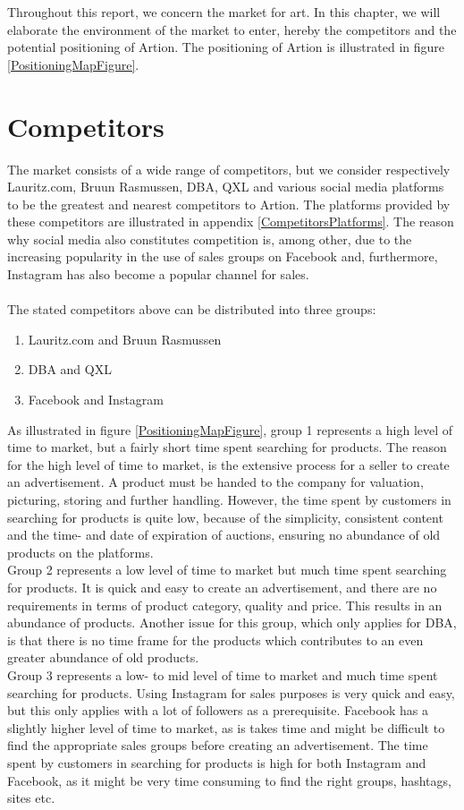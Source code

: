 Throughout this report, we concern the market for art. In this chapter, we will elaborate the environment of the market to enter, hereby the competitors and the potential positioning of Artion. The positioning of Artion is illustrated in figure \ref{PositioningMapFigure}.

\section{Competitors}
The market consists of a wide range of competitors, but we consider respectively Lauritz.com, Bruun Rasmussen, DBA, QXL and various social media platforms to be the greatest and nearest competitors to Artion. The platforms provided by these competitors are illustrated in appendix \ref{CompetitorsPlatforms}. The reason why social media also constitutes competition is, among other, due to the increasing popularity in the use of sales groups on Facebook and, furthermore, Instagram has also become a popular channel for sales. 
\\\\
The stated competitors above can be distributed into three groups:

\begin{enumerate}
\item Lauritz.com and Bruun Rasmussen
\item DBA and QXL
\item Facebook and Instagram
\end{enumerate}

As illustrated in figure \ref{PositioningMapFigure}, group 1 represents a high level of time to market, but a fairly short time spent searching for products. The reason for the high level of time to market, is the extensive process for a seller to create an advertisement. A product must be handed to the company for valuation, picturing, storing and further handling. However, the time spent by customers in searching for products is quite low, because of the simplicity, consistent content and the time- and date of expiration of auctions, ensuring no abundance of old products on the platforms.\\
\forceindent Group 2 represents a low level of time to market but much time spent searching for products. It is quick and easy to create an advertisement, and there are no requirements in terms of product category, quality and price. This results in an abundance of products. Another issue for this group, which only applies for DBA, is that there is no time frame for the products which contributes to an even greater abundance of old products.\\
\forceindent Group 3 represents a low- to mid level of time to market and much time spent searching for products. Using Instagram for sales purposes is very quick and easy, but this only applies with a lot of followers as a prerequisite. Facebook has a slightly higher level of time to market, as is takes time and might be difficult to find the appropriate sales groups before creating an advertisement. The time spent by customers in searching for products is high for both Instagram and Facebook, as it might be very time consuming to find the right groups, hashtags, sites etc.

